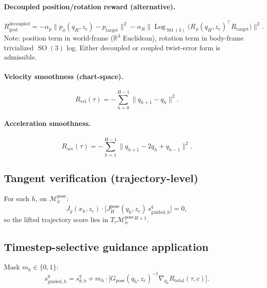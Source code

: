 \documentclass[11pt,a4paper]{article}
\DeclareMathOperator{\Log}{Log}
\DeclareMathOperator{\SO}{SO}
\newcommand{\R}{\mathbb{R}}
\newcommand{\Mpose}{\mathcal{M}_\phi^{\text{pose}}}
\begin{document}
\paragraph{Decoupled position/rotation reward (alternative).}
\begin{equation}
R_{\text{goal}}^{\text{decoupled}} = -\alpha_p \| p_\phi(q_H, z_e) - p_{\text{target}} \|^2 - \alpha_R \| \Log_{\SO(3)}\!\bigl( R_\phi(q_H, z_e)^\top R_{\text{target}} \bigr) \|^2.
\end{equation}
Note: position term in world-frame ($\R^3$ Euclidean), rotation term in body-frame trivialized $\SO(3)$ log. Either decoupled or coupled twist-error form is admissible.

\paragraph{Velocity smoothness (chart-space).}
\begin{equation}
R_{\text{vel}}(\tau) = -\sum_{h=0}^{H-1} \| q_{h+1} - q_h \|^2.
\end{equation}

\paragraph{Acceleration smoothness.}
\begin{equation}
R_{\text{acc}}(\tau) = -\sum_{h=1}^{H-1} \| q_{h+1} - 2 q_h + q_{h-1} \|^2.
\end{equation}

\subsection{Tangent verification (trajectory-level)}

For each $h$, on $\Mpose$:
\begin{equation}
J_g(x_h, z_e) \cdot \bigl[ J_H^{\text{pose}}(q_h, z_e) \, s_{\text{guided}, h}^q \bigr] = 0,
\end{equation}
so the lifted trajectory score lies in $T_\tau \Mpose^{H+1}$.

\subsection{Timestep-selective guidance application}

Mask $m_h \in \{0, 1\}$:
\begin{equation}
s_{\text{guided}, h}^q = s_{\theta, h}^q + m_h \cdot \bigl[ G_{\text{pose}}(q_h, z_e)^{-1} \nabla_{q_h} R_{\text{total}}(\tau, c) \bigr].
\end{equation}
\end{document}
